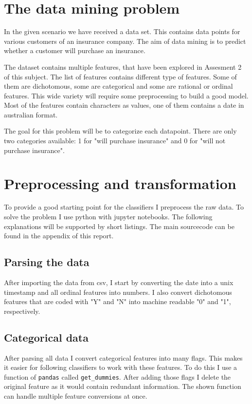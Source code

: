 
\section{The data mining problem}

In the given scenario we have received a data set. This contains data points for various customers of an insurance company. The aim of data mining is to predict whether a customer will purchase an insurance. 

The dataset contains multiple features, that have been explored in Assesment 2 of this subject. The list of features contains different type of features. Some of them are dichotomous, some are categorical and some are rational or ordinal features. This wide variety will require some preprocessing to build a good model. Most of the features contain characters as values, one of them contains a date in australian format.

The goal for this problem will be to categorize each datapoint. There are only two categories available: 1 for "will purchase insurance" and 0 for "will not purchase insurance".


\section{Preprocessing and transformation}

To provide a good starting point for the classifiers I preprocess the raw data. To solve the problem I use python with jupyter notebooks. The following explanations will be supported by short listings. The main sourcecode can be found in the appendix of this report.

\subsection{Parsing the data}
After importing the data from csv, I start by converting the date into a unix timestamp and all ordinal features into numbers. I also convert dichotomous features that are coded with "Y" and "N" into machine readable "0" and "1", respectively.



\subsection{Categorical data}
After parsing all data I convert categorical features into many flags. This makes it easier for following classifiers to work with these features. To do this I use a function of \texttt{pandas} called \texttt{get\_dummies}. After adding those flags I delete the original feature as it would contain redundant information. The shown function can handle multiple feature conversions at once.

